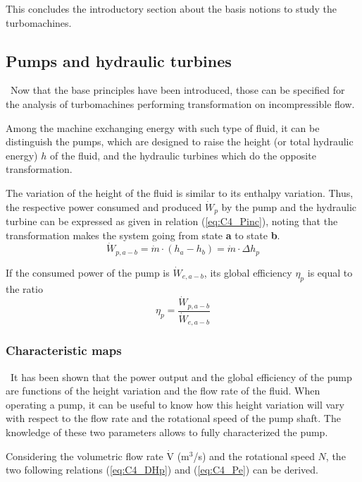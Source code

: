 This concludes the introductory section about the basis notions to study the turbomachines. \newpage
\subsection{Pumps and hydraulic turbines}
\quad\, Now that the base principles have been introduced, those can be specified for the analysis of turbomachines performing transformation on incompressible flow. 

Among the machine exchanging energy with such type of fluid, it can be distinguish the pumps, which are designed to raise the height (or total hydraulic energy) \(h\) of the fluid, and the hydraulic turbines which do the opposite transformation. 

The variation of the height of the fluid is similar to its enthalpy variation. Thus, the respective power consumed and produced \(\dot{W}_p\) by  the pump and the hydraulic turbine can be expressed as given in relation (\ref{eq:C4_Pinc}), noting that the transformation makes the system going from state \textbf{a} to state \textbf{b}.
\begin{equation}
    \dot{W}_{p,a-b} = \dot{m}\cdot (h_a - h_b)=\dot{m}\cdot\Delta h_p \label{eq:C4_Pinc}
\end{equation}


If the consumed power of the pump is \(\dot{W}_{e,a-b}\), its global efficiency \(\eta_p\) is equal to the ratio
\begin{equation}
    \eta_p = \frac{\dot{W}_{p,a-b}}{\dot{W}_{e,a-b}}\label{eq:C4_Etapump}
\end{equation}
\subsubsection{Characteristic maps}
\quad\ It has been shown that the power output and the global efficiency of the pump are functions of the height variation and the flow rate of the fluid. When operating a pump, it can be useful to know how this height variation will vary with respect to the flow rate and the rotational speed of the pump shaft. The knowledge of these two parameters allows to fully characterized the pump.

Considering the volumetric flow rate \(\dot{\mathrm{V}}\) (m$^3$/s) and the rotational speed \(N\), the two following relations (\ref{eq:C4_DHp}) and (\ref{eq:C4_Pe}) can be derived.

